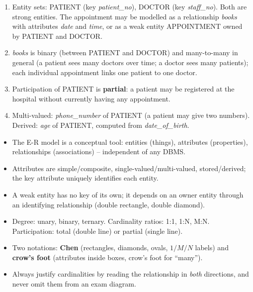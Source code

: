\documentclass[11pt]{article}
\newcommand{\cle}[1]{{\popxbold\color{popdark}#1}}
\begin{document}
\begin{corrige}
\begin{enumerate}
\item Entity sets: PATIENT (key \emph{patient\_no}), DOCTOR (key \emph{staff\_no}). Both are strong entities. The appointment may be modelled as a relationship \emph{books} with attributes \emph{date} and \emph{time}, or as a weak entity APPOINTMENT owned by PATIENT and DOCTOR.
\item \emph{books} is binary (between PATIENT and DOCTOR) and many-to-many in general (a patient sees many doctors over time; a doctor sees many patients); each individual appointment links one patient to one doctor.
\item Participation of PATIENT is \textbf{partial}: a patient may be registered at the hospital without currently having any appointment.
\item Multi-valued: \emph{phone\_number} of PATIENT (a patient may give two numbers). Derived: \emph{age} of PATIENT, computed from \emph{date\_of\_birth}.
\end{enumerate}
\end{corrige}

\begin{aretenir}
\begin{itemize}
\item The E-R model is a \cle{conceptual} tool: entities (things), attributes (properties), relationships (associations) -- independent of any DBMS.
\item Attributes are simple/composite, single-valued/multi-valued, stored/derived; the \cle{key attribute} uniquely identifies each entity.
\item A \cle{weak entity} has no key of its own; it depends on an owner entity through an identifying relationship (double rectangle, double diamond).
\item Degree: unary, binary, ternary. Cardinality ratios: 1:1, 1:N, M:N. Participation: total (double line) or partial (single line).
\item Two notations: \textbf{Chen} (rectangles, diamonds, ovals, $1/M/N$ labels) and \textbf{crow's foot} (attributes inside boxes, crow's foot for ``many'').
\item Always justify cardinalities by reading the relationship in \emph{both} directions, and never omit them from an exam diagram.
\end{itemize}
\end{aretenir}
\end{document}
